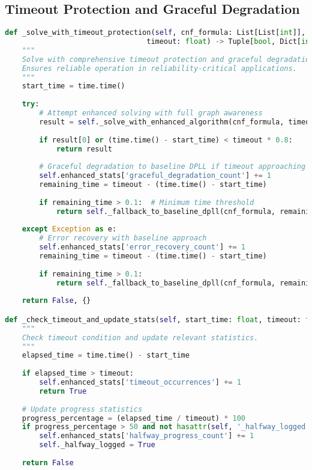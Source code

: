 \subsection{Timeout Protection and Graceful Degradation}
\label{appendix:timeout-protection}

\begin{lstlisting}[language=Python, caption=Robust Timeout Protection with Graceful Degradation]
def _solve_with_timeout_protection(self, cnf_formula: List[List[int]], 
                                 timeout: float) -> Tuple[bool, Dict[int, bool]]:
    """
    Solve with comprehensive timeout protection and graceful degradation.
    Ensures reliable operation in reliability-critical applications.
    """
    start_time = time.time()
    
    try:
        # Attempt enhanced solving with full graph awareness
        result = self._solve_with_enhanced_algorithm(cnf_formula, timeout, start_time)
        
        if result[0] or (time.time() - start_time) < timeout * 0.8:
            return result
        
        # Graceful degradation to baseline DPLL if timeout approaching
        self.enhanced_stats['graceful_degradation_count'] += 1
        remaining_time = timeout - (time.time() - start_time)
        
        if remaining_time > 0.1:  # Minimum time threshold
            return self._fallback_to_baseline_dpll(cnf_formula, remaining_time)
        
    except Exception as e:
        # Error recovery with baseline approach
        self.enhanced_stats['error_recovery_count'] += 1
        remaining_time = timeout - (time.time() - start_time)
        
        if remaining_time > 0.1:
            return self._fallback_to_baseline_dpll(cnf_formula, remaining_time)
    
    return False, {}

def _check_timeout_and_update_stats(self, start_time: float, timeout: float) -> bool:
    """
    Check timeout condition and update relevant statistics.
    """
    elapsed_time = time.time() - start_time
    
    if elapsed_time > timeout:
        self.enhanced_stats['timeout_occurrences'] += 1
        return True
    
    # Update progress statistics
    progress_percentage = (elapsed_time / timeout) * 100
    if progress_percentage > 50 and not hasattr(self, '_halfway_logged'):
        self.enhanced_stats['halfway_progress_count'] += 1
        self._halfway_logged = True
    
    return False
\end{lstlisting}

